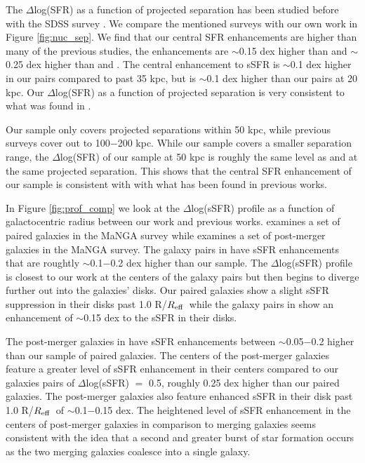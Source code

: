 \documentclass[iop,revtex4,twocolumn,apj,numberedappendix,appendixfloats]{emulateapj}
\newcommand{\reff}{$R_{\rm eff}$}
\begin{document}
The $\Delta$log(SFR) as a function of projected separation has been studied before with the SDSS survey \citep{Ellison:2008, Li:2008, Patton:2013, Scudder:2012, Bustamante:2020}. We compare the mentioned surveys with our own work in Figure \ref{fig:nuc_sep}. We find that our central SFR enhancements are higher than many of the previous studies, the enhancements are $\sim$0.15 dex higher than \citet{Scudder:2012} and $\sim$0.25 dex higher than \citet{Ellison:2008} and \citet{Bustamante:2020}. The central enhancement to sSFR is $\sim$0.1 dex higher in our pairs compared to \citet{Li:2008} past 35 kpc, but \citet{Li:2008} is $\sim$0.1 dex higher than our pairs at 20 kpc.  Our $\Delta$log(SFR) as a function of projected separation is very consistent to what was found in \citet{Patton:2013}.

Our sample only covers projected separations within 50 kpc, while previous surveys cover out to 100$-$200 kpc. While our sample covers a smaller separation range, the $\Delta$log(SFR) of our sample at 50 kpc is roughly the same level as \citet{Scudder:2012} and \citet{Patton:2013} at the same projected separation. This shows that the central SFR enhancement of our sample is consistent with with what has been found in previous works. 

In Figure \ref{fig:prof_comp} we look at the $\Delta$log(sSFR) profile as a function of galactocentric radius between our work and previous works. \citet{Pan:2019} examines a set of paired galaxies in the MaNGA survey while \citet{Thorp:2019} examines a set of post-merger galaxies in the MaNGA survey. The galaxy pairs in \citet{Pan:2019} have sSFR enhancements that are roughtly $\sim$0.1$-$0.2 dex higher than our sample. The $\Delta$log(sSFR) profile is closest to our work at the centers of the galaxy pairs but then begins to diverge further out into the galaxies' disks. Our paired galaxies show a slight sSFR suppression in their disks past 1.0 R/\reff\ while the galaxy pairs in \citet{Pan:2019} show an enhancement of $\sim$0.15 dex to the sSFR in their disks. 

The post-merger galaxies in \citet{Thorp:2019} have sSFR enhancements between $\sim$0.05$-$0.2 higher than our sample of paired galaxies. The centers of the post-merger galaxies feature a greater level of sSFR enhancement in their centers compared to our galaxies pairs of $\Delta$log(sSFR) $=$ 0.5, roughly 0.25 dex higher than our paired galaxies. The post-merger galaxies also feature enhanced sSFR in their disk past 1.0 R/\reff\ of $\sim$0.1$-$0.15 dex. The heightened level of sSFR enhancement in the centers of post-merger galaxies in comparison to merging galaxies seems consistent with the idea that a second and greater burst of star formation occurs as the two merging galaxies coalesce into a single galaxy. 
\end{document}
